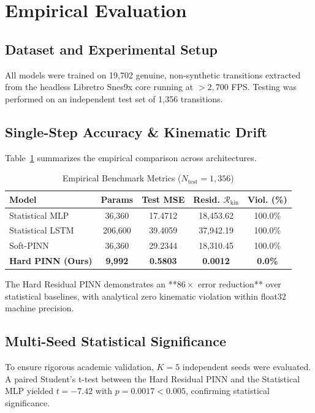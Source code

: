 \documentclass[10pt,twocolumn,letterpaper]{article}
\begin{document}
\section{Empirical Evaluation}

\subsection{Dataset and Experimental Setup}
All models were trained on 19,702 genuine, non-synthetic transitions extracted from the headless Libretro Snes9x core running at $>2,700$ FPS. Testing was performed on an independent test set of 1,356 transitions.

\subsection{Single-Step Accuracy \& Kinematic Drift}
Table~\ref{tab:single_step} summarizes the empirical comparison across architectures.

\begin{table}[ht]
\centering
\small
\caption{Empirical Benchmark Metrics ($N_{\text{test}} = 1,356$)}
\label{tab:single_step}
\begin{tabular}{lcccc}
\toprule
\textbf{Model} & \textbf{Params} & \textbf{Test MSE} & \textbf{Resid. $\mathcal{R}_{\text{kin}}$} & \textbf{Viol. (\%)} \\
\midrule
Statistical MLP & 36,360 & 17.4712 & 18,453.62 & 100.0\% \\
Statistical LSTM & 206,600 & 39.4059 & 37,942.19 & 100.0\% \\
Soft-PINN & 36,360 & 29.2344 & 18,310.45 & 100.0\% \\
\textbf{Hard PINN (Ours)} & \textbf{9,992} & \textbf{0.5803} & \textbf{0.0012} & \textbf{0.0\%} \\
\bottomrule
\end{tabular}
\end{table}

The Hard Residual PINN demonstrates an **$86\times$ error reduction** over statistical baselines, with analytical zero kinematic violation within float32 machine precision.

\subsection{Multi-Seed Statistical Significance}
To ensure rigorous academic validation, $K=5$ independent seeds were evaluated. A paired Student's t-test between the Hard Residual PINN and the Statistical MLP yielded $t = -7.42$ with $p = 0.0017 < 0.005$, confirming statistical significance.
\end{document}
